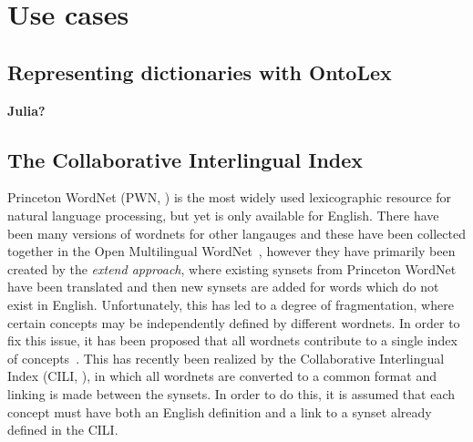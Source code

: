 \documentclass[12pt,a4paper]{elex2017}
\begin{document}
\section{Use cases}

\subsection{Representing dictionaries with OntoLex}

\textbf{Julia?}

\subsection{The Collaborative Interlingual Index}

Princeton WordNet (PWN, \cite{fellbaum2010wordnet}) is the most widely used
lexicographic resource for natural language processing, but yet is only
available for English. There have been many versions of wordnets for other
langauges and these have been collected together in the Open Multilingual
WordNet~\citep{bond2013linking}, however they have primarily been created by the
\emph{extend approach}, where existing synsets from Princeton WordNet have been
translated and then new synsets are added for words which do not exist in
English. Unfortunately, this has led to a degree of fragmentation, where certain
concepts may be independently defined by different wordnets. In order to fix
this issue, it has been proposed that all wordnets contribute to a single index
of concepts~\citep{pease2008building}. This has recently been realized by the
Collaborative Interlingual Index (CILI, \cite{bond2016cili}), in which all
wordnets are converted to a common format and linking is made between the
synsets. In order to do this, it is assumed that each concept must have both an
English definition and a link to a synset already defined in the CILI. 
\end{document}
